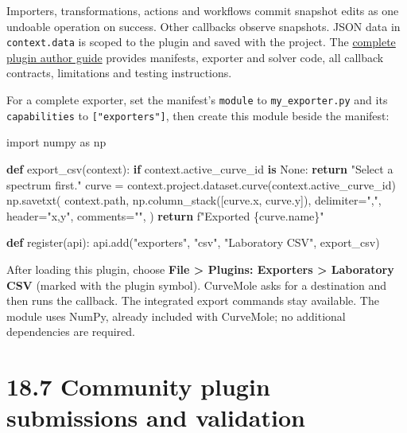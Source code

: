 \documentclass[
  10pt,
  a4paper,
  oneside]{scrreprt}
\newenvironment{Shaded}{}{}
\newcommand{\ControlFlowTok}[1]{\textcolor[rgb]{0.00,0.44,0.13}{\textbf{#1}}}
\newcommand{\ImportTok}[1]{#1}
\newcommand{\KeywordTok}[1]{\textcolor[rgb]{0.00,0.44,0.13}{\textbf{#1}}}
\newcommand{\NormalTok}[1]{#1}
\newcommand{\OperatorTok}[1]{\textcolor[rgb]{0.40,0.40,0.40}{#1}}
\newcommand{\SpecialCharTok}[1]{\textcolor[rgb]{0.25,0.44,0.63}{#1}}
\newcommand{\SpecialStringTok}[1]{\textcolor[rgb]{0.73,0.40,0.53}{#1}}
\newcommand{\StringTok}[1]{\textcolor[rgb]{0.25,0.44,0.63}{#1}}
\newcommand{\VariableTok}[1]{\textcolor[rgb]{0.10,0.09,0.49}{#1}}
\begin{document}
Importers, transformations, actions and workflows commit snapshot edits
as one undoable operation on success. Other callbacks observe snapshots.
JSON data in \texttt{context.data} is scoped to the plugin and saved
with the project. The \href{plugins.md}{complete plugin author guide}
provides manifests, exporter and solver code, all callback contracts,
limitations and testing instructions.

For a complete exporter, set the manifest's \texttt{module} to
\texttt{my\_exporter.py} and its \texttt{capabilities} to
\texttt{{[}"exporters"{]}}, then create this module beside the manifest:

\begin{Shaded}
\begin{Highlighting}[]
\ImportTok{import}\NormalTok{ numpy }\ImportTok{as}\NormalTok{ np}


\KeywordTok{def}\NormalTok{ export\_csv(context):}
    \ControlFlowTok{if}\NormalTok{ context.active\_curve\_id }\KeywordTok{is} \VariableTok{None}\NormalTok{:}
        \ControlFlowTok{return} \StringTok{"Select a spectrum first."}
\NormalTok{    curve }\OperatorTok{=}\NormalTok{ context.project.dataset.curve(context.active\_curve\_id)}
\NormalTok{    np.savetxt(}
\NormalTok{        context.path,}
\NormalTok{        np.column\_stack([curve.x, curve.y]),}
\NormalTok{        delimiter}\OperatorTok{=}\StringTok{","}\NormalTok{, header}\OperatorTok{=}\StringTok{"x,y"}\NormalTok{, comments}\OperatorTok{=}\StringTok{""}\NormalTok{,}
\NormalTok{    )}
    \ControlFlowTok{return} \SpecialStringTok{f"Exported }\SpecialCharTok{\{}\NormalTok{curve}\SpecialCharTok{.}\NormalTok{name}\SpecialCharTok{\}}\SpecialStringTok{"}


\KeywordTok{def}\NormalTok{ register(api):}
\NormalTok{    api.add(}\StringTok{"exporters"}\NormalTok{, }\StringTok{"csv"}\NormalTok{, }\StringTok{"Laboratory CSV"}\NormalTok{, export\_csv)}
\end{Highlighting}
\end{Shaded}

After loading this plugin, choose \textbf{File \textgreater{} Plugins:
Exporters \textgreater{} Laboratory CSV} (marked with the plugin
symbol). CurveMole asks for a destination and then runs the callback.
The integrated export commands stay available. The module uses NumPy,
already included with CurveMole; no additional dependencies are
required.

\hypertarget{community-plugin-submissions-and-validation}{%
\section{18.7 Community plugin submissions and
validation}\label{community-plugin-submissions-and-validation}}
\end{document}
